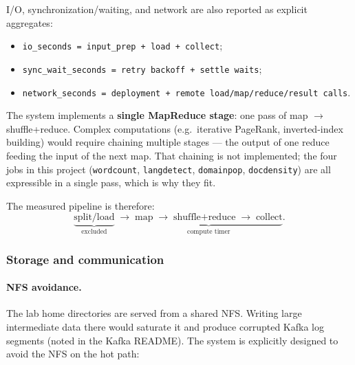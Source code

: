 \documentclass[11pt,a4paper]{article}
\begin{document}
I/O, synchronization/waiting, and network are also reported as explicit
aggregates:
\begin{itemize}[leftmargin=1.5em]
  \item \texttt{io\_seconds = input\_prep + load + collect};
  \item \texttt{sync\_wait\_seconds = retry backoff + settle waits};
  \item \texttt{network\_seconds = deployment + remote load/map/reduce/result calls}.
\end{itemize}

The system implements a \textbf{single MapReduce stage}: one pass of
map $\to$ shuffle+reduce. Complex computations (e.g.\ iterative PageRank,
inverted-index building) would require chaining multiple stages — the output
of one reduce feeding the input of the next map. That chaining is not
implemented; the four jobs in this project (\texttt{wordcount},
\texttt{langdetect}, \texttt{domainpop}, \texttt{docdensity}) are all
expressible in a single pass, which is why they fit.

The measured pipeline is therefore:
\[
\underbrace{\text{split/load}}_{\text{excluded}} \;\to\;
\underbrace{\text{map} \;\to\; \text{shuffle+reduce} \;\to\; \text{collect}}_{\text{compute timer}}.
\]

\subsubsection{Storage and communication}

\paragraph{NFS avoidance.}
The lab home directories are served from a shared NFS. Writing large intermediate
data there would saturate it and produce corrupted Kafka log segments (noted in
the Kafka README). The system is explicitly designed to avoid the NFS on the hot
path:
\end{document}
